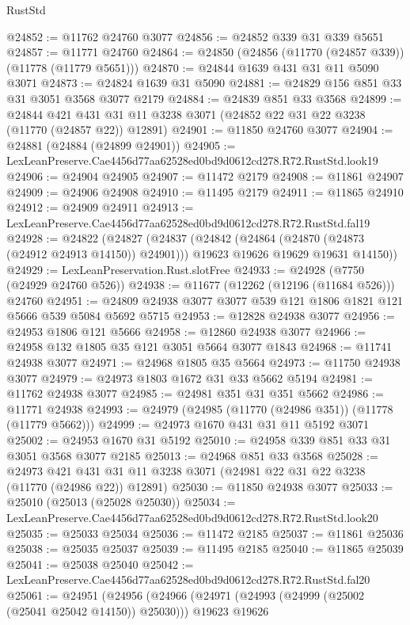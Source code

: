 \begin{lexlean}{RustStd}
\begin{coremodule}
@24852 := @11762 @24760 @3077
@24856 := @24852 @339 @31 @339 @5651
@24857 := @11771 @24760
@24864 := @24850 (@24856 (@11770 (@24857 @339)) (@11778 (@11779 @5651)))
@24870 := @24844 @1639 @431 @31 @11 @5090 @3071
@24873 := @24824 @1639 @31 @5090
@24881 := @24829 @156 @851 @33 @31 @3051 @3568 @3077 @2179
@24884 := @24839 @851 @33 @3568
@24899 := @24844
    @421
    @431
    @31
    @11
    @3238
    @3071
    (@24852 @22 @31 @22 @3238 (@11770 (@24857 @22)) @12891)
@24901 := @11850 @24760 @3077
@24904 := @24881 (@24884 (@24899 @24901))
@24905 := LexLeanPreserve.Cae4456d77aa62528ed0bd9d0612cd278.R72.RustStd.look19
@24906 := @24904 @24905
@24907 := @11472 @2179
@24908 := @11861 @24907
@24909 := @24906 @24908
@24910 := @11495 @2179
@24911 := @11865 @24910
@24912 := @24909 @24911
@24913 := LexLeanPreserve.Cae4456d77aa62528ed0bd9d0612cd278.R72.RustStd.fal19
@24928 := @24822
    (@24827
      (@24837
        (@24842 (@24864 (@24870 (@24873 (@24912 @24913 @14150)) @24901)))
        @19623
        @19626
        @19629
        @19631
        @14150))
@24929 := LexLeanPreservation.Rust.slotFree
@24933 := @24928 (@7750 (@24929 @24760 @526))
@24938 := @11677 (@12262 (@12196 (@11684 @526))) @24760
@24951 := @24809 @24938 @3077 @3077 @539 @121 @1806 @1821 @121 @5666 @539 @5084 @5692 @5715
@24953 := @12828 @24938 @3077
@24956 := @24953 @1806 @121 @5666
@24958 := @12860 @24938 @3077
@24966 := @24958 @132 @1805 @35 @121 @3051 @5664 @3077 @1843
@24968 := @11741 @24938 @3077
@24971 := @24968 @1805 @35 @5664
@24973 := @11750 @24938 @3077
@24979 := @24973 @1803 @1672 @31 @33 @5662 @5194
@24981 := @11762 @24938 @3077
@24985 := @24981 @351 @31 @351 @5662
@24986 := @11771 @24938
@24993 := @24979 (@24985 (@11770 (@24986 @351)) (@11778 (@11779 @5662)))
@24999 := @24973 @1670 @431 @31 @11 @5192 @3071
@25002 := @24953 @1670 @31 @5192
@25010 := @24958 @339 @851 @33 @31 @3051 @3568 @3077 @2185
@25013 := @24968 @851 @33 @3568
@25028 := @24973
    @421
    @431
    @31
    @11
    @3238
    @3071
    (@24981 @22 @31 @22 @3238 (@11770 (@24986 @22)) @12891)
@25030 := @11850 @24938 @3077
@25033 := @25010 (@25013 (@25028 @25030))
@25034 := LexLeanPreserve.Cae4456d77aa62528ed0bd9d0612cd278.R72.RustStd.look20
@25035 := @25033 @25034
@25036 := @11472 @2185
@25037 := @11861 @25036
@25038 := @25035 @25037
@25039 := @11495 @2185
@25040 := @11865 @25039
@25041 := @25038 @25040
@25042 := LexLeanPreserve.Cae4456d77aa62528ed0bd9d0612cd278.R72.RustStd.fal20
@25061 := @24951
    (@24956
      (@24966
        (@24971 (@24993 (@24999 (@25002 (@25041 @25042 @14150)) @25030)))
        @19623
        @19626

\end{coremodule}
\end{lexlean}
